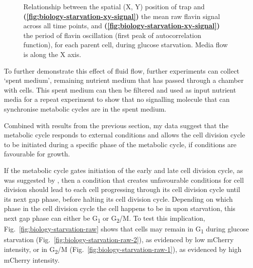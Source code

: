 \begin{figure}[hb!]
  \caption[
    Relationship between the spatial position of trap and the mean raw flavin signal across all time points, and the period of flavin oscillation, for each parent cell, during glucose starvation.
  ]{
    Relationship between the spatial (X, Y) position of trap and
    \textbf{(\ref{fig:biology-starvation-xy-signal})} the mean raw flavin signal across all time points, and
    \textbf{(\ref{fig:biology-starvation-xy-signal})} the period of flavin oscillation (first peak of autocorrelation function), for each parent cell, during glucose starvation.
    Media flow is along the X axis.
  }
  \label{fig:biology-starvation-xy}
\end{figure}

To further demonstrate this effect of fluid flow, further experiments can collect `spent medium', remaining nutrient medium that has passed through a chamber with cells.
This spent medium can then be filtered and used as input nutrient media for a repeat experiment to show that no signalling molecule that can synchronise metabolic cycles are in the spent medium.

Combined with results from the previous section, my data suggest that the metabolic cycle responds to external conditions and allows the cell division cycle to be initiated during a specific phase of the metabolic cycle, if conditions are favourable for growth.

If the metabolic cycle gates initiation of the early and late cell division cycle, as was suggested by \textcite{ozsezenInferenceHighLevelInteraction2019}, then a condition that creates unfavourable conditions for cell division should lead to each cell progressing through its cell division cycle until its next gap phase, before halting its cell division cycle.
Depending on which phase in the cell division cycle the cell happens to be in upon starvation, this next gap phase can either be G\textsubscript{1} or G\textsubscript{2}/M.
To test this implication, Fig.\ \ref{fig:biology-starvation-raw} shows that cells may remain in G\textsubscript{1} during glucose starvation (Fig.\ \ref{fig:biology-starvation-raw-2}), as evidenced by low mCherry intensity, or in G\textsubscript{2}/M (Fig.\ \ref{fig:biology-starvation-raw-1}), as evidenced by high mCherry intensity.

